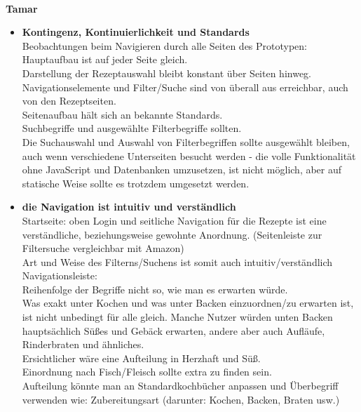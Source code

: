 \documentclass[parskip,10pt,abstracton]{scrartcl}
\begin{document}
\hrulefill\\
\textbf{Tamar}
\begin{itemize}
 \item \textbf{Kontingenz, Kontinuierlichkeit und Standards}\\
 Beobachtungen beim Navigieren durch alle Seiten des Prototypen:\\
 Hauptaufbau ist auf jeder Seite gleich.\\
 Darstellung der Rezeptauswahl bleibt konstant über Seiten hinweg.\\
 Navigationselemente und Filter/Suche sind von überall aus erreichbar, auch von den Rezeptseiten.\\
 Seitenaufbau hält sich an bekannte Standards.\\
 Suchbegriffe und ausgewählte Filterbegriffe sollten.\\
 Die Suchauswahl und Auswahl von Filterbegriffen sollte ausgewählt bleiben, auch wenn verschiedene Unterseiten besucht werden - die volle Funktionalität ohne JavaScript und Datenbanken umzusetzen, ist nicht möglich, aber auf statische Weise sollte es trotzdem umgesetzt werden.
 
 \item \textbf{die Navigation ist intuitiv und verständlich}\\
 Startseite: oben Login und seitliche Navigation für die Rezepte ist eine verständliche, beziehungsweise gewohnte Anordnung. (Seitenleiste zur Filtersuche vergleichbar mit Amazon)\\
 Art und Weise des Filterns/Suchens ist somit auch intuitiv/verständlich\\
 Navigationsleiste:\\
 Reihenfolge der Begriffe nicht so, wie man es erwarten würde.\\
 Was exakt unter Kochen und was unter Backen einzuordnen/zu erwarten ist, ist nicht unbedingt für alle gleich. Manche Nutzer würden unten Backen hauptsächlich Süßes und Gebäck erwarten, andere aber auch Aufläufe, Rinderbraten und ähnliches.\\
 Ersichtlicher wäre eine Aufteilung in Herzhaft und Süß.\\
 Einordnung nach Fisch/Fleisch sollte extra zu finden sein.\\
 Aufteilung könnte man an Standardkochbücher anpassen und Überbegriff verwenden wie: Zubereitungsart (darunter: Kochen, Backen, Braten usw.)


\end{itemize}
\end{document}
